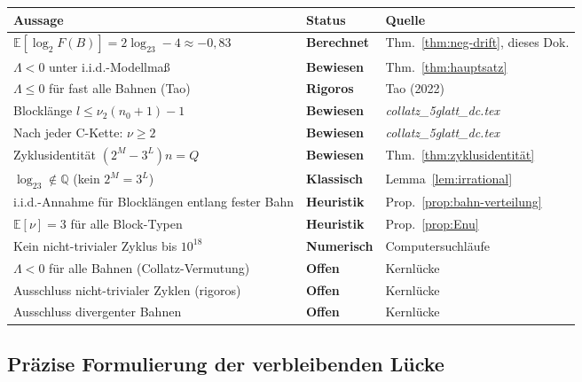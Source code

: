 \documentclass[12pt,a4paper]{article}
\newcommand{\vii}{\nu_2}
\newcommand{\E}{\mathbb{E}}
\newcommand{\Q}{\mathbb{Q}}
\newcommand{\logt}{\log_2}        %
\begin{document}
\begin{center}
\renewcommand{\arraystretch}{1.5}
\begin{tabular}{p{7.5cm} p{2.5cm} p{3.5cm}}
\toprule
\textbf{Aussage} & \textbf{Status} & \textbf{Quelle} \\
\midrule
$\E[\logt F(B)] = 2\logt 3 - 4 \approx -0{,}83$
  & \textcolor{bewiesengrün}{\bfseries Berechnet}
  & Thm.~\ref{thm:neg-drift}, dieses Dok. \\
$\Lambda < 0$ unter i.i.d.-Modellmaß
  & \textcolor{bewiesengrün}{\bfseries Bewiesen}
  & Thm.~\ref{thm:hauptsatz} \\
$\Lambda \leq 0$ für fast alle Bahnen (Tao)
  & \textcolor{bewiesengrün}{\bfseries Rigoros}
  & Tao (2022) \\
Blocklänge $l \leq \vii(n_0+1)-1$
  & \textcolor{bewiesengrün}{\bfseries Bewiesen}
  & \textit{collatz\_5glatt\_dc.tex} \\
Nach jeder C-Kette: $\nu \geq 2$
  & \textcolor{bewiesengrün}{\bfseries Bewiesen}
  & \textit{collatz\_5glatt\_dc.tex} \\
Zyklusidentität $(2^M-3^L)n = Q$
  & \textcolor{bewiesengrün}{\bfseries Bewiesen}
  & Thm.~\ref{thm:zyklusidentität} \\
$\logt 3 \notin \Q$ (kein $2^M = 3^L$)
  & \textcolor{bewiesengrün}{\bfseries Klassisch}
  & Lemma~\ref{lem:irrational} \\
\midrule
i.i.d.-Annahme für Blocklängen entlang fester Bahn
  & \textcolor{warnorange}{\bfseries Heuristik}
  & Prop.~\ref{prop:bahn-verteilung} \\
$\E[\nu] = 3$ für alle Block-Typen
  & \textcolor{warnorange}{\bfseries Heuristik}
  & Prop.~\ref{prop:Enu} \\
Kein nicht-trivialer Zyklus bis $10^{18}$
  & \textcolor{warnorange}{\bfseries Numerisch}
  & Computersuchläufe \\
\midrule
$\Lambda < 0$ für alle Bahnen (Collatz-Vermutung)
  & \textcolor{lückenrot}{\bfseries Offen}
  & Kernlücke \\
Ausschluss nicht-trivialer Zyklen (rigoros)
  & \textcolor{lückenrot}{\bfseries Offen}
  & Kernlücke \\
Ausschluss divergenter Bahnen
  & \textcolor{lückenrot}{\bfseries Offen}
  & Kernlücke \\
\bottomrule
\end{tabular}
\end{center}

\subsection{Präzise Formulierung der verbleibenden Lücke}
\end{document}
